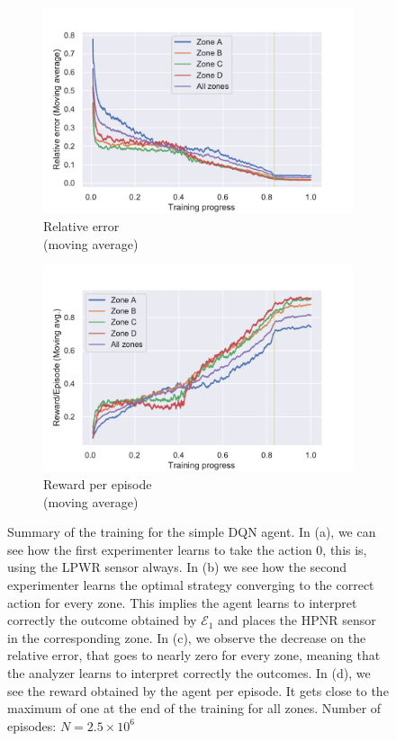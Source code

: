 \documentclass[11pt,a4paper,twoside]{report}
\newcommand{\+}{\textnormal{+} }
\theoremstyle{definition}
\numberwithin{equation}{chapter}
\begin{document}
\begin{figure}[H]
  \bigskip  %
  \begin{subfigure}{0.45\textwidth}
  \includegraphics[width=\linewidth]{figures/Relative-Error-TSS.pdf}
  \caption{Relative error \\ (moving average)}
  \end{subfigure}
  \hfill %
  \begin{subfigure}{0.45\textwidth}
  \includegraphics[width=\linewidth]{figures/Rewards-TSS.pdf}
  \caption{Reward per episode \\ (moving average)}
  \end{subfigure}
  \caption{Summary of the training for the simple DQN agent. In (a), we can see
  how the first experimenter learns to take the action $0$, this is, using the
  LPWR sensor always. In (b) we see how the second experimenter learns the
  optimal strategy converging to the correct action for every zone. This implies
  the agent learns to interpret correctly the outcome obtained by $\mathscr{E}_1$ and
  places the HPNR sensor in the corresponding zone. In (c), we observe the
  decrease on the relative error, that goes to nearly zero for every zone,
  meaning that the analyzer learns to interpret correctly the outcomes. In (d),
  we see the reward obtained by the agent per episode. It gets close to the 
  maximum of one at the end of the training for all zones.
  Number of episodes: $N=2.5\times10^6$}
  \label{fig:TSS}
\end{figure}
\end{document}

